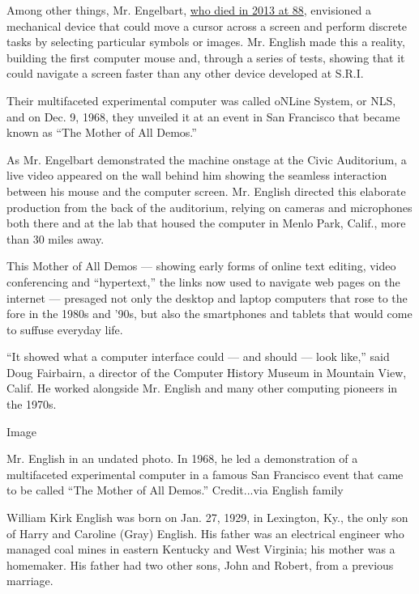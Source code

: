 Among other things, Mr. Engelbart,
\href{https://www.nytimes3xbfgragh.onion/2013/07/04/technology/douglas-c-engelbart-inventor-of-the-computer-mouse-dies-at-88.html\#:~:text=Engelbart\%20died\%20on\%20Tuesday\%20at,the\%20cause\%20was\%20kidney\%20failure.}{who
died in 2013 at 88}, envisioned a mechanical device that could move a
cursor across a screen and perform discrete tasks by selecting
particular symbols or images. Mr. English made this a reality, building
the first computer mouse and, through a series of tests, showing that it
could navigate a screen faster than any other device developed at S.R.I.

Their multifaceted experimental computer was called oNLine System, or
NLS, and on Dec. 9, 1968, they unveiled it at an event in San Francisco
that became known as ``The Mother of All Demos.''

As Mr. Engelbart demonstrated the machine onstage at the Civic
Auditorium, a live video appeared on the wall behind him showing the
seamless interaction between his mouse and the computer screen. Mr.
English directed this elaborate production from the back of the
auditorium, relying on cameras and microphones both there and at the lab
that housed the computer in Menlo Park, Calif., more than 30 miles away.

This Mother of All Demos --- showing early forms of online text editing,
video conferencing and ``hypertext,'' the links now used to navigate web
pages on the internet --- presaged not only the desktop and laptop
computers that rose to the fore in the 1980s and '90s, but also the
smartphones and tablets that would come to suffuse everyday life.

``It showed what a computer interface could --- and should --- look
like,'' said Doug Fairbairn, a director of the Computer History Museum
in Mountain View, Calif. He worked alongside Mr. English and many other
computing pioneers in the 1970s.

Image

Mr. English in an undated photo. In 1968, he led a demonstration of a
multifaceted experimental computer in a famous San Francisco event that
came to be called ``The Mother of All Demos.'' Credit...via English
family

William Kirk English was born on Jan. 27, 1929, in Lexington, Ky., the
only son of Harry and Caroline (Gray) English. His father was an
electrical engineer who managed coal mines in eastern Kentucky and West
Virginia; his mother was a homemaker. His father had two other sons,
John and Robert, from a previous marriage.


